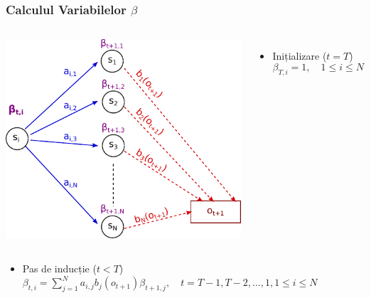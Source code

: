 \begin{frame}
  \frametitle{Calculul Variabilelor $\beta$}
  \begin{columns}[B]
    \includegraphics[width=\textwidth]{graphics/forward-backward/general/backward.pdf}
    \begin{itemize}
    \item Inițializare ($t=T$)
      \begin{equation}
        \beta_{T,i}=1,\quad 1 \le i \le N
        \label{eq:beta-init}
      \end{equation}
    \end{itemize}
  \end{columns}
  \begin{itemize}
  \item Pas de inducție ($t < T$) \\
    $\beta_{t,i}=\displaystyle\sum_{j=1}^{N}a_{i,j}b_j(o_{t+1})\beta_{t+1,j},
    \quad t = T-1, T-2, \ldots , 1, 1 \le i \le N$
  \end{itemize}
\end{frame}

